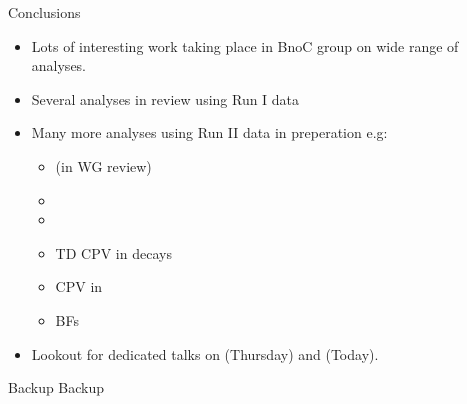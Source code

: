 \documentclass{beamer}
\begin{document}
\begin{frame}{Conclusions}
  \begin{itemize}
  \item Lots of interesting work taking place in BnoC group on wide range of analyses.
  \item Several analyses in review using Run I data
  \item Many more analyses using Run II data in preperation e.g:
    \begin{itemize}
    \item \decay{\Bs}{\phiz \phiz} (in WG review)
    \item \decay{\Bc}{\Kp\Km\pip}
    \item \decay{\Bs}{\KS \KS}
    \item TD CPV in  decays
    \item CPV in 
    \item {} BFs
    \end{itemize}
  \item Lookout for dedicated talks on \decay{\Bp}{\pip\pim\pip} (Thursday) and  (Today).
  \end{itemize}
\end{frame}
  
\appendix
\begin{frame}{Backup}
  Backup
\end{frame}
\end{document}
